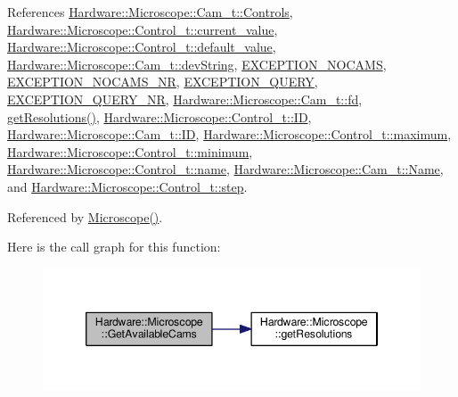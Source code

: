 References \hyperlink{_microscope_8h_source_l00129}{Hardware\+::\+Microscope\+::\+Cam\+\_\+t\+::\+Controls}, \hyperlink{_microscope_8h_source_l00085}{Hardware\+::\+Microscope\+::\+Control\+\_\+t\+::current\+\_\+value}, \hyperlink{_microscope_8h_source_l00084}{Hardware\+::\+Microscope\+::\+Control\+\_\+t\+::default\+\_\+value}, \hyperlink{_microscope_8h_source_l00124}{Hardware\+::\+Microscope\+::\+Cam\+\_\+t\+::dev\+String}, \hyperlink{_microscope_not_found_exception_8h_source_l00009}{E\+X\+C\+E\+P\+T\+I\+O\+N\+\_\+\+N\+O\+C\+A\+M\+S}, \hyperlink{_microscope_not_found_exception_8h_source_l00010}{E\+X\+C\+E\+P\+T\+I\+O\+N\+\_\+\+N\+O\+C\+A\+M\+S\+\_\+\+N\+R}, \hyperlink{_microscope_not_found_exception_8h_source_l00011}{E\+X\+C\+E\+P\+T\+I\+O\+N\+\_\+\+Q\+U\+E\+R\+Y}, \hyperlink{_microscope_not_found_exception_8h_source_l00012}{E\+X\+C\+E\+P\+T\+I\+O\+N\+\_\+\+Q\+U\+E\+R\+Y\+\_\+\+N\+R}, \hyperlink{_microscope_8h_source_l00131}{Hardware\+::\+Microscope\+::\+Cam\+\_\+t\+::fd}, \hyperlink{_microscope_8cpp_source_l00123}{get\+Resolutions()}, \hyperlink{_microscope_8h_source_l00086}{Hardware\+::\+Microscope\+::\+Control\+\_\+t\+::\+I\+D}, \hyperlink{_microscope_8h_source_l00125}{Hardware\+::\+Microscope\+::\+Cam\+\_\+t\+::\+I\+D}, \hyperlink{_microscope_8h_source_l00082}{Hardware\+::\+Microscope\+::\+Control\+\_\+t\+::maximum}, \hyperlink{_microscope_8h_source_l00081}{Hardware\+::\+Microscope\+::\+Control\+\_\+t\+::minimum}, \hyperlink{_microscope_8h_source_l00080}{Hardware\+::\+Microscope\+::\+Control\+\_\+t\+::name}, \hyperlink{_microscope_8h_source_l00123}{Hardware\+::\+Microscope\+::\+Cam\+\_\+t\+::\+Name}, and \hyperlink{_microscope_8h_source_l00083}{Hardware\+::\+Microscope\+::\+Control\+\_\+t\+::step}.



Referenced by \hyperlink{_microscope_8cpp_source_l00012}{Microscope()}.



Here is the call graph for this function\+:
\nopagebreak
\begin{figure}[H]
\begin{center}
\leavevmode
\includegraphics[width=346pt]{class_hardware_1_1_microscope_a71a409aae67baf63fd27678eda462e38_cgraph}
\end{center}
\end{figure}




